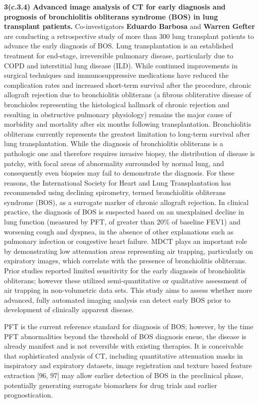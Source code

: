 \documentclass[11pt,]{article}
\begin{document}
\textbf{3(c.3.4) Advanced image analysis of CT for early diagnosis and
prognosis of bronchiolitis obliterans syndrome (BOS) in lung transplant
patients.} Co-investigators \textbf{Eduardo Barbosa} and \textbf{Warren
Gefter} are conducting a retrospective study of more than 300 lung
transplant patients to advance the early diagnosis of BOS. Lung
transplantation is an established treatment for end-stage, irreversible
pulmonary disease, particularly due to COPD and interstitial lung
disease (ILD). While continued improvements in surgical techniques and
immunosuppressive medications have reduced the complication rates and
increased short-term survival after the procedure, chronic allograft
rejection due to bronchiolitis obliterans (a fibrous obliterative
disease of bronchioles representing the histological hallmark of chronic
rejection and resulting in obstructive pulmonary physiology) remains the
major cause of morbidity and mortality after six months following
transplantation. Bronchiolitis obliterans currently represents the
greatest limitation to long-term survival after lung transplantation.
While the diagnosis of bronchiolitis obliterans is a pathologic one and
therefore requires invasive biopsy, the distribution of disease is
patchy, with focal areas of abnormality surrounded by normal lung, and
consequently even biopsies may fail to demonstrate the diagnosis. For
these reasons, the International Society for Heart and Lung
Transplantation has recommended using declining spirometry, termed
bronchiolitis obliterans syndrome (BOS), as a surrogate marker of
chronic allograft rejection. In clinical practice, the diagnosis of BOS
is suspected based on an unexplained decline in lung function (measured
by PFT, of greater than 20\% of baseline FEV1) and worsening cough and
dyspnea, in the absence of other explanations such as pulmonary
infection or congestive heart failure. MDCT plays an important role by
demonstrating low attenuation areas representing air trapping,
particularly on expiratory images, which correlate with the presence of
bronchiolitis obliterans. Prior studies reported limited sensitivity for
the early diagnosis of bronchiolitis obliterans; however these utilized
semi-quantitative or qualitative assessment of air trapping in
non-volumetric data sets. This study aims to assess whether more
advanced, fully automated imaging analysis can detect early BOS prior to
development of clinically apparent disease.

PFT is the current reference standard for diagnosis of BOS; however, by
the time PFT abnormalities beyond the threshold of BOS diagnosis ensue,
the disease is already manifest and is not reversible with existing
therapies. It is conceivable that sophisticated analysis of CT,
including quantitative attenuation masks in inspiratory and expiratory
datasets, image registration and texture based feature extraction {[}96,
97{]} may allow earlier detection of BOS in the preclinical phase,
potentially generating surrogate biomarkers for drug trials and earlier
prognostication.
\end{document}
